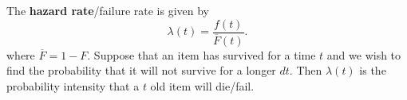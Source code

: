 
\begin{definition}
	The \textbf{hazard rate}/failure rate is given by \[
		\lambda (t) = \frac{f(t)}{\overline{F}(t)}
	.\] where \( \overline{F} = 1 - F \). Suppose that an item has survived for a time \( t \) and we wish to find the probability that it will not survive for a longer \( dt \). Then \( \lambda (t) \) is the probability intensity that a \( t \) old item will die/fail.
\end{definition}
